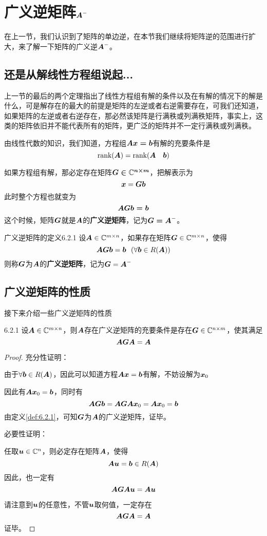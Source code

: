 \documentclass[12pt, a4paper, oneside, UTF8]{ctexbook}
\begin{document}
\section{广义逆矩阵$\bs{A}^-$}
在上一节，我们认识到了矩阵的单边逆，在本节我们继续将矩阵逆的范围进行扩大，来了解一下矩阵的广义逆$\bs{A}^-$。
\subsection{还是从解线性方程组说起...}
上一节的最后的两个定理指出了线性方程组有解的条件以及在有解的情况下的解是什么，可是解存在的最大的前提是矩阵的左逆或者右逆需要存在，可我们还知道，如果矩阵的左逆或者右逆存在，那必然该矩阵是行满秩或列满秩矩阵，事实上，这类的矩阵依旧并不能代表所有的矩阵，更广泛的矩阵并不一定行满秩或列满秩。

由线性代数的知识，我们知道，方程组$\bs{Ax=b}$有解的充要条件是\[\text{rank}(\bs{A})=\text{rank}(\bs{A}\ \ \ \bs{b})\]

如果方程组有解，那必定存在矩阵$\bs{G\in \mathbb{C}^{n\times m}}$，把解表示为\[\bs{x}=\bs{Gb}\]此时整个方程也就变为\[\bs{AGb=b}\]这个时候，矩阵$\bs{G}$就是$\bs{A}$的\textbf{广义逆矩阵}，记为$\bs{G=A}^-$。
\begin{defn}{广义逆矩阵的定义}{6.2.1}
    设$\bs{A}\in \C^{m\times n}$，如果存在矩阵$\G\in\C^{m\times n}$，使得\[\A\G\b=\b\ \ (\forall\b\in R(\A))\]则称$\G$为$\A$的\textbf{广义逆矩阵}，记为$\G=\A^-$
\end{defn}
\subsection{广义逆矩阵的性质}
接下来介绍一些广义逆矩阵的性质
\begin{them}{}{6.2.1}
    设$\A\in\C^{m\times n}$，则$\A$存在广义逆矩阵的充要条件是存在$\G\in\C^{n\times m}$，使其满足\[\A\G\A=\A\]
\end{them}

\begin{proof}

    充分性证明：

    由于$\forall\b\in R(\A)$，因此可以知道方程$\A\x=\b$有解，不妨设解为$\bs{x}_0$

    因此有$\A\bs{x}_0=\b$，同时有\[\A\G\b=\A\G\A\bs{x}_0=\A\bs{x}_0=\b\]由定义\ref{def:6.2.1}，可知$\G$为$\A$的广义逆矩阵，证毕。

    必要性证明：

    任取$\u\in\C^{n}$，则必定存在矩阵$\A$，使得\[\A\u=\b\in R(\A)\]因此，也一定有\[\A\G\A\u=\A\u\]

    请注意到$\u$的任意性，不管$\u$取何值，一定存在\[\A\G\A=\A\]证毕。
\end{proof}
\end{document}
